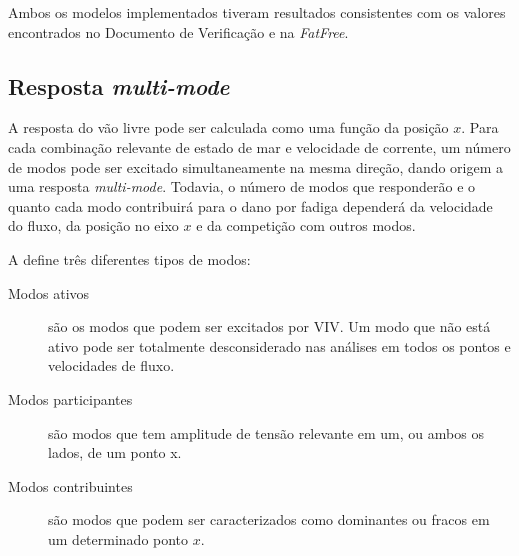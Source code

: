 Ambos os modelos implementados tiveram resultados consistentes com os valores encontrados no Documento de Verificação e na \textit{FatFree}.

\subsection{Resposta \textit{multi-mode}}

A resposta do vão livre pode ser calculada como uma função da posição $x$. Para cada combinação relevante de estado de mar e velocidade de corrente, um número de modos pode ser excitado simultaneamente na mesma direção, dando origem a uma resposta \textit{multi-mode}. Todavia, o número de modos que responderão e o quanto cada modo contribuirá para o dano por fadiga dependerá da velocidade do fluxo, da posição no eixo $x$ e da competição com outros modos.

A  define três diferentes tipos de modos: 
\begin{description}
	\item[Modos ativos] são os modos que podem ser excitados por VIV. Um modo que não está ativo pode ser totalmente desconsiderado nas análises em todos os pontos e velocidades de fluxo.
	
	\item[Modos participantes] são modos que tem amplitude de tensão relevante em um, ou ambos os lados, de um ponto x.

	\item [Modos contribuintes] são modos que podem ser caracterizados como dominantes ou fracos em um determinado ponto $x$. %
%	
%	
%		
%				
%		
		
\end{description}


